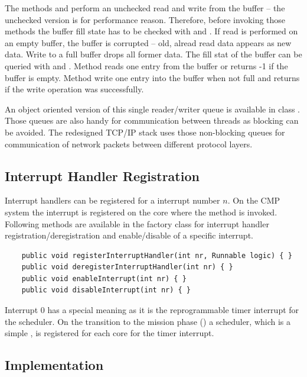 The methods  and  perform an unchecked
read and write from the buffer -- the unchecked version is for
performance reason. Therefore, before invoking those methods the
buffer fill state has to be checked with  and
. If read is performed on an empty buffer, the buffer is
corrupted -- old, alread read data appears as new data. Write to a
full buffer drops all former data. The fill stat of the buffer can be
queried with  and . Method
 reads one entry from the buffer or returns -1 if
the buffer is empty. Method  write one entry
into the buffer when not full and returns  if the write
operation was successfully.

An object oriented version of this single reader/writer queue is
available in class .  Those queues are also handy for
communication between threads as blocking can be avoided. The
redesigned TCP/IP stack  uses those non-blocking queues
for communication of network packets between different protocol
layers.

\subsection{Interrupt Handler Registration}

Interrupt handlers can be registered for a interrupt number $n$. On
the CMP system the interrupt is registered on the core where the
method is invoked. Following methods are available in the factory
class for interrupt handler registration/deregistration and
enable/disable of a specific interrupt.

\begin{samepage}
\begin{lstlisting}
    public void registerInterruptHandler(int nr, Runnable logic) { }
    public void deregisterInterruptHandler(int nr) { }
    public void enableInterrupt(int nr) { }
    public void disableInterrupt(int nr) { }
\end{lstlisting}
\end{samepage}

Interrupt 0 has a special meaning as it is the reprogrammable timer
interrupt for the scheduler. On the transition to the mission phase
() a scheduler, which is a simple
, is registered for each core for the timer interrupt.

\subsection{Implementation}

